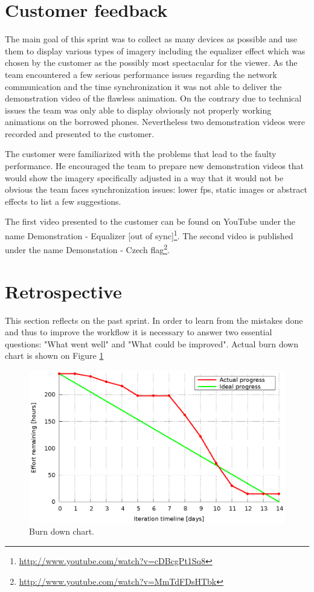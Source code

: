 \section{Customer feedback} \label{txt:sprint5_customerfeedback}
The main goal of this sprint was to collect as many devices as possible and use them to display various types of imagery including the equalizer effect which was chosen by the customer as the possibly most spectacular for the viewer. As the team encountered a few serious performance issues regarding the network communication and the time synchronization it was not able to deliver the demonstration video of the flawless animation. On the contrary due to technical issues the team was only able to display obviously not properly working animations on the borrowed phones. Nevertheless two demonstration videos were recorded and presented to the customer.

The customer were familiarized with the problems that lead to the faulty performance. He encouraged the team to prepare new demonstration videos that would show the imagery specifically adjusted in a way that it would not be obvious the team faces synchronization issues: lower fps, static images or abstract effects to list a few suggestions.

The first video presented to the customer can be found on YouTube under the name Demonstration - Equalizer [out of sync]\footnote{\url{http://www.youtube.com/watch?v=cDBcgPt1Sq8}}. 
The second video is published under the name Demonstation - Czech flag\footnote{\url{http://www.youtube.com/watch?v=MmTdFDsHTbk}}.

\section{Retrospective}
This section reflects on the past sprint. In order to learn from the mistakes done and thus to improve the workflow it is necessary to answer two essential questions: "What went well" and "What could be improved". Actual burn down chart is shown on Figure \ref{fig:Burn5 }

\begin{figure}[h]
	\centering
		\includegraphics[width=14cm]{burndowns/sprint5.eps}
	\caption{Burn down chart.}
	\label{fig:Burn5 }
\end{figure}

